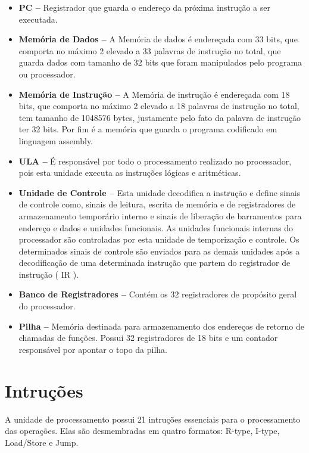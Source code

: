 \documentclass{report}
\begin{document}
  \begin{itemize}
    \item \textbf{PC --} Registrador que guarda o endereço da próxima instrução a ser executada.
    
    \item \textbf{Memória de Dados --} A Memória de dados é endereçada com 33 bits, que comporta no máximo 2 elevado a 33 palavras de instrução no total, que guarda dados com tamanho de 32 bits que foram manipulados pelo programa ou processador. 
   
    \item \textbf{Memória de Instrução --} A Memória de instrução é endereçada com 18 bits, que comporta no máximo 2 elevado a 18 palavras de instrução no total, tem tamanho de 1048576 bytes, justamente pelo fato da palavra de instrução ter 32 bits. Por fim é a memória que guarda o programa codificado em linguagem assembly.
    
    \item \textbf{ULA --} É responsável por todo o processamento realizado no processador, pois esta unidade executa as instruções lógicas e aritméticas.
    
    \item \textbf{Unidade de Controle --} Esta unidade decodifica a instrução e define sinais de controle como, sinais de leitura, escrita de memória e de registradores de armazenamento temporário interno e sinais de liberação de barramentos para endereço e dados e unidades funcionais. As unidades funcionais internas do processador são controladas por esta unidade de temporização e controle. Os determinados sinais de controle são enviados para as demais unidades após a decodificação de uma determinada instrução que partem do registrador de instrução ( IR ).
    
    \item \textbf{Banco de Registradores --} Contém os 32 registradores de propósito geral do processador.
    
    \item \textbf{Pilha --} Memória destinada para armazenamento dos endereços de retorno de chamadas de funções. Possui 32 registradores de 18 bits e um contador responsável por apontar o topo da pilha.
  \end{itemize}
  
  \section{Intruções}
  A unidade de processamento possui 21 intruções essenciais para o processamento das operações. Elas são desmembradas em quatro formatos: R-type, I-type, Load/Store e Jump.
  
\end{document}
